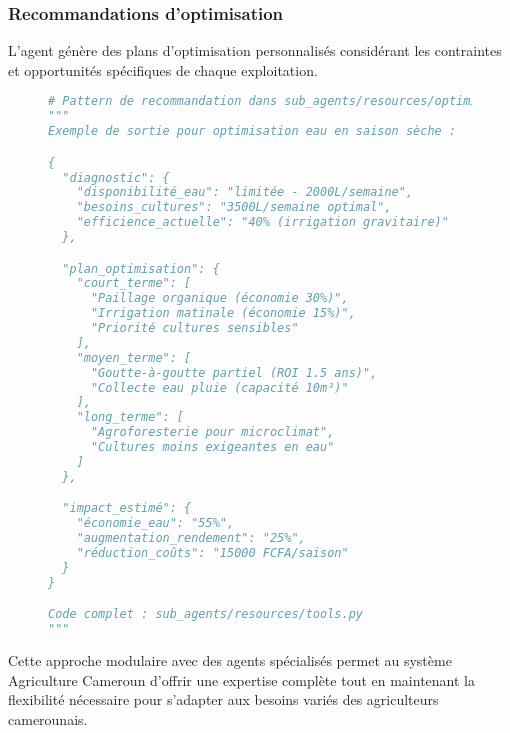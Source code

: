 \subsubsection{Recommandations d'optimisation}

L'agent génère des plans d'optimisation personnalisés considérant les contraintes et opportunités spécifiques de chaque exploitation.

\begin{figure}[H]
\centering
\begin{lstlisting}[language=Python, caption=Exemple de recommandation intégrée]
# Pattern de recommandation dans sub_agents/resources/optimizer.py
"""
Exemple de sortie pour optimisation eau en saison sèche :

{
  "diagnostic": {
    "disponibilité_eau": "limitée - 2000L/semaine",
    "besoins_cultures": "3500L/semaine optimal",
    "efficience_actuelle": "40% (irrigation gravitaire)"
  },

  "plan_optimisation": {
    "court_terme": [
      "Paillage organique (économie 30%)",
      "Irrigation matinale (économie 15%)",
      "Priorité cultures sensibles"
    ],
    "moyen_terme": [
      "Goutte-à-goutte partiel (ROI 1.5 ans)",
      "Collecte eau pluie (capacité 10m³)"
    ],
    "long_terme": [
      "Agroforesterie pour microclimat",
      "Cultures moins exigeantes en eau"
    ]
  },

  "impact_estimé": {
    "économie_eau": "55%",
    "augmentation_rendement": "25%",
    "réduction_coûts": "15000 FCFA/saison"
  }
}

Code complet : sub_agents/resources/tools.py
"""
\end{lstlisting}
\end{figure}

Cette approche modulaire avec des agents spécialisés permet au système Agriculture Cameroun d'offrir une expertise complète tout en maintenant la flexibilité nécessaire pour s'adapter aux besoins variés des agriculteurs camerounais.
